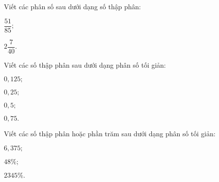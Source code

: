 \begin{vd} %
Viết các phân số sau dưới dạng số thập phân:
\begin{listEX}[2]
\item $\dfrac{51}{85};$
\item $2\dfrac{7}{40}.$
\end{listEX} 
\end{vd}
\begin{vd} %
Viết các số thập phân sau dưới dạng phân số tối giản:
\begin{listEX}[4]
\item $0{,}125;$
\item $0{,}25;$
\item $0{,}5;$
\item $0{,}75.$
\end{listEX} 
\end{vd}
\begin{vd} %
Viết các số thập phân hoặc phần trăm sau dưới dạng phân số tối giản:
\begin{listEX}[3]
\item $6{,}375;$
\item $48\%;$
\item $2345\%.$
\end{listEX} 
\end{vd}

